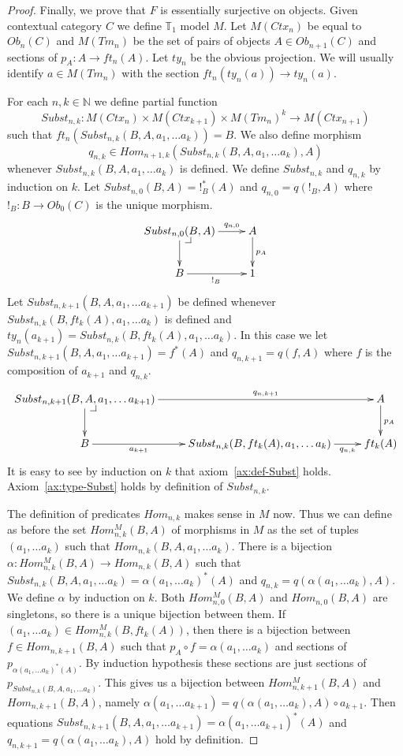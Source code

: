 \documentclass[reqno]{amsart}
\makeatletter
\theoremstyle{definition}
\theoremstyle{remark}
\numberwithin{figure}{section}
\newcommand{\pb}[1][dr]{\save*!/#1-1.2pc/#1:(-1,1)@^{|-}\restore}
\makeatother
\begin{document}
\begin{proof}
Finally, we prove that $F$ is essentially surjective on objects.
Given contextual category $C$ we define $\mathbb{T}_1$ model $M$.
Let $M(Ctx_n)$ be equal to $Ob_n(C)$ and $M(Tm_n)$ be the set of pairs of objects $A \in Ob_{n+1}(C)$ and sections of $p_A : A \to ft_n(A)$.
Let $ty_n$ be the obvious projection.
We will usually identify $a \in M(Tm_n)$ with the section $ft_n(ty_n(a)) \to ty_n(a)$.

For each $n,k \in \mathbb{N}$ we define partial function
\[ Subst_{n,k} : M(Ctx_n) \times M(Ctx_{k+1}) \times M(Tm_n)^k \to M(Ctx_{n+1}) \]
such that $ft_n(Subst_{n,k}(B, A, a_1, \ldots a_k)) = B$.
We also define morphism
\[ q_{n,k} \in Hom_{n+1,k}(Subst_{n,k}(B, A, a_1, \ldots a_k), A) \]
whenever $Subst_{n,k}(B, A, a_1, \ldots a_k)$ is defined.
We define $Subst_{n,k}$ and $q_{n,k}$ by induction on $k$.
Let $Subst_{n,0}(B,A) = !_B^*(A)$ and $q_{n,0} = q(!_B,A)$ where $!_B : B \to Ob_0(C)$ is the unique morphism.
\[ \xymatrix{ Subst_{n,0}(B,A) \ar[r]^-{q_{n,0}} \ar[d] \pb & A \ar[d]^{p_A} \\
              B \ar[r]_{!_B} & 1
            } \]
Let $Subst_{n,k+1}(B, A, a_1, \ldots a_{k+1})$ be defined whenever $Subst_{n,k}(B, ft_k(A), a_1, \ldots a_k)$ is defined and $ty_n(a_{k+1}) = Subst_{n,k}(B, ft_k(A), a_1, \ldots a_k)$.
In this case we let $Subst_{n,k+1}(B, A, a_1, \ldots a_{k+1}) = f^*(A)$ and $q_{n,k+1} = q(f,A)$ where $f$ is the composition of $a_{k+1}$ and $q_{n,k}$.
\[ \xymatrix{ Subst_{n,k+1}(B, A, a_1, \ldots a_{k+1}) \ar[rr]^-{q_{n,k+1}} \ar[d] \pb & & A \ar[d]^{p_A} \\
              B \ar[r]_-{a_{k+1}} & Subst_{n,k}(B, ft_k(A), a_1, \ldots a_k) \ar[r]_-{q_{n,k}} & ft_k(A)
            } \]
It is easy to see by induction on $k$ that axiom~\eqref{ax:def-Subst} holds.
Axiom~\eqref{ax:type-Subst} holds by definition of $Subst_{n,k}$.

The definition of predicates $Hom_{n,k}$ makes sense in $M$ now.
Thus we can define as before the set $Hom^M_{n,k}(B,A)$ of morphisms in $M$ as the set of tuples $(a_1, \ldots a_k)$ such that $Hom_{n,k}(B, A, a_1, \ldots a_k)$.
There is a bijection $\alpha : Hom^M_{n,k}(B,A) \to Hom_{n,k}(B,A)$ such that $Subst_{n,k}(B, A, a_1, \ldots a_k) = \alpha(a_1, \ldots a_k)^*(A)$ and $q_{n,k} = q(\alpha(a_1, \ldots a_k), A)$.
We define $\alpha$ by induction on $k$.
Both $Hom^M_{n,0}(B,A)$ and $Hom_{n,0}(B,A)$ are singletons, so there is a unique bijection between them.
If $(a_1, \ldots a_k) \in Hom^M_{n,k}(B,ft_k(A))$, then there is a bijection between $f \in Hom_{n,k+1}(B,A)$ such that $p_A \circ f = \alpha(a_1, \ldots a_k)$ and sections of $p_{\alpha(a_1, \ldots a_k)^*(A)}$.
By induction hypothesis these sections are just sections of $p_{Subst_{n,k}(B, A, a_1, \ldots a_k)}$.
This gives us a bijection between $Hom^M_{n,k+1}(B,A)$ and $Hom_{n,k+1}(B,A)$, namely $\alpha(a_1, \ldots a_{k+1}) = q(\alpha(a_1, \ldots a_k), A) \circ a_{k+1}$.
Then equations $Subst_{n,k+1}(B, A, a_1, \ldots a_{k+1}) = \alpha(a_1, \ldots a_{k+1})^*(A)$ and $q_{n,k+1} = q(\alpha(a_1, \ldots a_k), A)$ hold by definition.


\end{proof}
\end{document}
